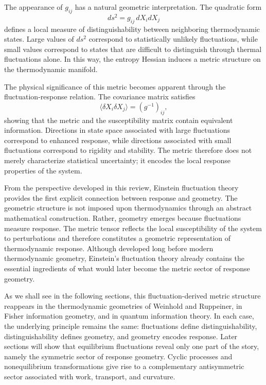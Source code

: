 The appearance of \(g_{ij}\) has a natural geometric interpretation. The quadratic form
\[
ds^2
=
g_{ij}\,
dX_i dX_j
\]
defines a local measure of distinguishability between neighboring thermodynamic states. Large values of \(ds^2\) correspond to statistically unlikely fluctuations, while small values correspond to states that are difficult to distinguish through thermal fluctuations alone. In this way, the entropy Hessian induces a metric structure on the thermodynamic manifold.

The physical significance of this metric becomes apparent through the fluctuation-response relation. The covariance matrix satisfies
\[
\langle
\delta X_i \delta X_j
\rangle
=
(g^{-1})_{ij},
\]
showing that the metric and the susceptibility matrix contain equivalent information. Directions in state space associated with large fluctuations correspond to enhanced response, while directions associated with small fluctuations correspond to rigidity and stability. The metric therefore does not merely characterize statistical uncertainty; it encodes the local response properties of the system.

From the perspective developed in this review, Einstein fluctuation theory provides the first explicit connection between response and geometry. The geometric structure is not imposed upon thermodynamics through an abstract mathematical construction. Rather, geometry emerges because fluctuations measure response. The metric tensor reflects the local susceptibility of the system to perturbations and therefore constitutes a geometric representation of thermodynamic response. Although developed long before modern thermodynamic geometry, Einstein’s fluctuation theory already contains the essential ingredients of what would later become the metric sector of response geometry.

As we shall see in the following sections, this fluctuation-derived metric structure reappears in the thermodynamic geometries of Weinhold and Ruppeiner, in Fisher information geometry, and in quantum information theory. In each case, the underlying principle remains the same: fluctuations define distinguishability, distinguishability defines geometry, and geometry encodes response. Later sections will show that equilibrium fluctuations reveal only one part of the story, namely the symmetric sector of response geometry. Cyclic processes and nonequilibrium transformations give rise to a complementary antisymmetric sector associated with work, transport, and curvature.


